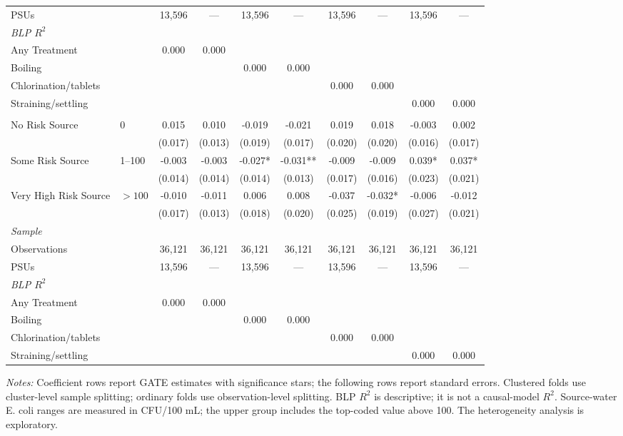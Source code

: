 \begin{landscape}
\begin{table}[p]
\begin{adjustbox}{max width=\linewidth, center}
\begin{tabular}{llcccccccc}
\quad PSUs &  & 13,596 & --- & 13,596 & --- & 13,596 & --- & 13,596 & --- \\
\multicolumn{10}{l}{\textit{BLP $R^{2}$}} \\
\quad Any Treatment &  & 0.000 & 0.000 &  &  &  &  &  &  \\
\quad Boiling &  &  &  & 0.000 & 0.000 &  &  &  &  \\
\quad Chlorination/tablets &  &  &  &  &  & 0.000 & 0.000 &  &  \\
\quad Straining/settling &  &  &  &  &  &  &  & 0.000 & 0.000 \\
\addlinespace[4pt]
\multicolumn{10}{l}{Diarrhea (under-5): Initial source-water E. coli risk} \\
No Risk Source & 0 & 0.015 & 0.010 & -0.019 & -0.021 & 0.019 & 0.018 & -0.003 & 0.002 \\
 &  & (0.017) & (0.013) & (0.019) & (0.017) & (0.020) & (0.020) & (0.016) & (0.017) \\
Some Risk Source & 1--100 & -0.003 & -0.003 & -0.027* & -0.031** & -0.009 & -0.009 & 0.039* & 0.037* \\
 &  & (0.014) & (0.014) & (0.014) & (0.013) & (0.017) & (0.016) & (0.023) & (0.021) \\
Very High Risk Source & $>100$ & -0.010 & -0.011 & 0.006 & 0.008 & -0.037 & -0.032* & -0.006 & -0.012 \\
 &  & (0.017) & (0.013) & (0.018) & (0.020) & (0.025) & (0.019) & (0.027) & (0.021) \\
\multicolumn{10}{l}{\textit{Sample}} \\
\quad Observations &  & 36,121 & 36,121 & 36,121 & 36,121 & 36,121 & 36,121 & 36,121 & 36,121 \\
\quad PSUs &  & 13,596 & --- & 13,596 & --- & 13,596 & --- & 13,596 & --- \\
\multicolumn{10}{l}{\textit{BLP $R^{2}$}} \\
\quad Any Treatment &  & 0.000 & 0.000 &  &  &  &  &  &  \\
\quad Boiling &  &  &  & 0.000 & 0.000 &  &  &  &  \\
\quad Chlorination/tablets &  &  &  &  &  & 0.000 & 0.000 &  &  \\
\quad Straining/settling &  &  &  &  &  &  &  & 0.000 & 0.000 \\
\bottomrule
\end{tabular}
\end{adjustbox}
\par\vspace{3pt}
\begin{minipage}{\linewidth}\footnotesize \textit{Notes:} Coefficient rows report GATE estimates with significance stars; the following rows report standard errors. Clustered folds use cluster-level sample splitting; ordinary folds use observation-level splitting. BLP $R^2$ is descriptive; it is not a causal-model $R^2$. Source-water E. coli ranges are measured in CFU/100 mL; the upper group includes the top-coded value above 100. The heterogeneity analysis is exploratory.\end{minipage}
\end{table}
\end{landscape}
